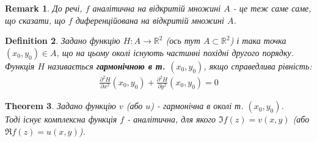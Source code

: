 \documentclass[a4paper, 10pt]{article}
\theoremstyle{theoremdd}
\newtheorem{theorem}{Theorem}[subsection]
\theoremstyle{theoremdd}
\newtheorem{definition}[theorem]{Definition}
\theoremstyle{theoremdd}
\theoremstyle{theoremdd}
\theoremstyle{theoremdd}
\theoremstyle{theoremdd}
\newtheorem{remark}[theorem]{Remark}
\theoremstyle{theoremdd}
\theoremstyle{theoremdd}
\begin{document}
\begin{remark}
До речі, $f$ аналітична на відкритій множині $A$ - це теж саме саме, що сказати, що $f$ диференційована на відкритій множині $A$.
\end{remark}

\begin{definition}
Задано функцію $H: A \rightarrow \mathbb{R}^2$ (ось тут $A \subset \mathbb{R}^2$) і така точка $(x_0,y_0) \in A$, що на цьому околі існують частинні похідні другого порядку.\\
Функція $H$ називається \textbf{гармонічною в т. $(x_0,y_0)$}, якщо справедлива рівність:
\begin{align*}
\frac{\partial^2 H}{\partial x^2}(x_0,y_0) + \frac{\partial^2 H}{\partial y^2}(x_0,y_0) = 0
\end{align*}
\end{definition}

\begin{theorem}
Задано функцію $v$ (або $u$) - гармонічна в околі т. $(x_0,y_0)$.\\
Тоді існує комплексна функція $f$ - аналітична, для якого $\Im f(z) = v(x,y)$ (або $\Re f(z) = u(x,y)$).
\end{theorem}
\end{document}
